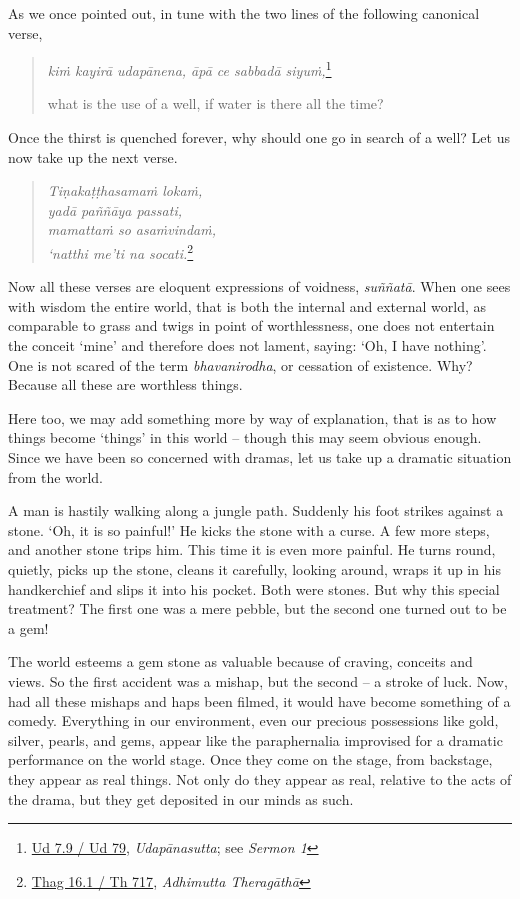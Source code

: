 As we once pointed out, in tune with the two lines of the following canonical verse,

\begin{quote}
\emph{kiṁ kayirā udapānena, āpā ce sabbadā siyuṁ,}\footnote{\href{https://suttacentral.net/ud7.9/pli/ms}{Ud 7.9 / Ud 79}, \emph{Udapānasutta}; see \emph{Sermon 1}}

what is the use of a well, if water is there all the time?
\end{quote}

Once the thirst is quenched forever, why should one go in search of a well? Let us now take up the next verse.

\begin{quote}
\emph{Tiṇakaṭṭhasamaṁ lokaṁ,}\\
\emph{yadā paññāya passati,}\\
\emph{mamattaṁ so asaṁvindaṁ,}\\
\emph{`natthi me'ti na socati.}\footnote{\href{https://suttacentral.net/thag16.1/pli/ms}{Thag 16.1 / Th 717}, \emph{Adhimutta Theragāthā}}
\end{quote}

Now all these verses are eloquent expressions of voidness, \emph{suññatā}. When one sees with wisdom the entire world, that is both the internal and external world, as comparable to grass and twigs in point of worthlessness, one does not entertain the conceit `mine' and therefore does not lament, saying: `Oh, I have nothing'. One is not scared of the term \emph{bhavanirodha}, or cessation of existence. Why? Because all these are worthless things.

Here too, we may add something more by way of explanation, that is as to how things become `things' in this world -- though this may seem obvious enough. Since we have been so concerned with dramas, let us take up a dramatic situation from the world.

A man is hastily walking along a jungle path. Suddenly his foot strikes against a stone. `Oh, it is so painful!' He kicks the stone with a curse. A few more steps, and another stone trips him. This time it is even more painful. He turns round, quietly, picks up the stone, cleans it carefully, looking around, wraps it up in his handkerchief and slips it into his pocket. Both were stones. But why this special treatment? The first one was a mere pebble, but the second one turned out to be a gem!

The world esteems a gem stone as valuable because of craving, conceits and views. So the first accident was a mishap, but the second -- a stroke of luck. Now, had all these mishaps and haps been filmed, it would have become something of a comedy. Everything in our environment, even our precious possessions like gold, silver, pearls, and gems, appear like the paraphernalia improvised for a dramatic performance on the world stage. Once they come on the stage, from backstage, they appear as real things. Not only do they appear as real, relative to the acts of the drama, but they get deposited in our minds as such.

